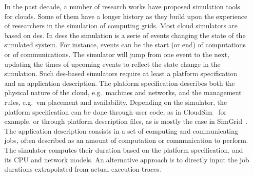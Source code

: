 In the  past decade, a number  of research works have  proposed simulation tools
for clouds. Some of them have a longer history as they build upon the experience
of researchers in  the simulation of computing grids. Most  cloud simulators are
based on \ac{des}.   In \aclp{des} the simulation is a  serie of events changing
the state of  the simulated system.  For  instance, events can be  the start (or
end) of  computations or of  communications.  The  simulator will jump  from one
event to the  next, updating the times  of upcoming events to  reflect the state
change in  the simulation.   Such \ac{des}-based simulators  require at  least a
platform   specification  and   an   application   description.   The   platform
specification describes both the physical nature of the cloud, e.g.~machines and
networks,  and the  management rules,  e.g.~\ac{vm} placement  and availability.
Depending on the simulator, the platform  specification can be done through user
code,  as   in  CloudSim~\cite{cloudsim}   for  example,  or   through  platform
description  files,  as  is  mostly the  case  in  SimGrid~\cite{simgrid}.   The
application description consists  in a set of computing  and communicating jobs,
often described  as an amount  of computation  or communication to  perform. The
simulator computes their  duration based on the platform  specification, and its
CPU and  network models.  An alternative  approach is to directly  input the job
durations extrapolated from actual execution traces.


